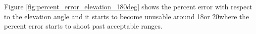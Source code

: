Figure \ref{fig:percent_error_elevation_180deg} shows the percent error with respect to the elevation angle and it starts to become unusable around 18\textdegree \space or 20\textdegree \space where the percent error starts to shoot past acceptable ranges.







